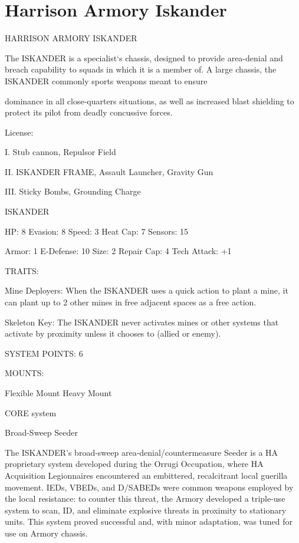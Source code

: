 \section{Harrison Armory Iskander}

                              HARRISON ARMORY ISKANDER

The ISKANDER is a specialist‘s chassis, designed to provide area-denial and breach capability to squads in
which it is a member of. A large chassis, the ISKANDER commonly sports weapons meant to ensure

dominance in all close-quarters situations, as well as increased blast shielding to protect its pilot from
deadly concussive forces.

                                                   License:

I. Stub cannon, Repulsor Field

II. ISKANDER FRAME, Assault Launcher, Gravity Gun

III. Sticky Bombs, Grounding Charge


                                                ISKANDER

 HP: 8          Evasion: 8                            Speed: 3           Heat Cap: 7        Sensors: 15

 Armor: 1       E-Defense: 10                         Size: 2            Repair Cap: 4      Tech Attack:
                                                                                            +1

                                                  TRAITS:

 Mine Deployers: When the ISKANDER uses a quick action to plant a mine, it can plant up to 2 other
 mines in free adjacent spaces as a free action.

 Skeleton Key: The ISKANDER never activates mines or other systems that activate by proximity unless
 it chooses to (allied or enemy).

                                            SYSTEM POINTS: 6

                                                  MOUNTS:

 Flexible Mount                    Heavy Mount

                                               CORE system




                                             Broad-Sweep Seeder

 The ISKANDER’s broad-sweep area-denial/countermeasure Seeder is a HA proprietary system
 developed during the Orrugi Occupation, where HA Acquisition Legionnaires encountered an
 embittered, recalcitrant local guerilla movement. IEDs, VBEDs, and D/SABEDs were common weapons
 employed by the local resistance: to counter this threat, the Armory developed a triple-use system to
 scan, ID, and eliminate explosive threats in proximity to stationary units. This system proved successful
 and, with minor adaptation, was tuned for use on Armory chassis.

